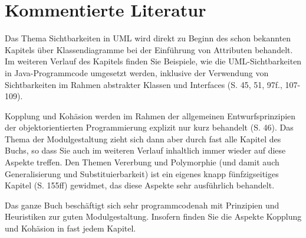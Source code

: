 \section{Kommentierte Literatur}
\label{sec:Kap-9.4}


{Das Thema Sichtbarkeiten in UML wird direkt zu Beginn des schon bekannten \mbox{Kapitels} über Klassendiagramme bei der Einführung von Attributen behandelt. Im weiteren Verlauf des Kapitels finden Sie Beispiele, wie die UML-Sichtbarkeiten in Java-Programmcode umgesetzt werden, inklusive der Verwendung von Sichtbar\-keiten im Rahmen abstrakter Klassen und Interfaces (S. 45, 51, 97f., 107-109).}

{Kopplung und Kohäsion werden im Rahmen der allgemeinen Entwurfsprinzipien der objektorientierten Programmierung explizit nur kurz behandelt (S. 46). Das \mbox{Thema} der Modulgestaltung zieht sich dann aber durch fast alle Kapitel des Buchs, so dass Sie auch im weiteren Verlauf inhaltlich immer wieder auf diese Aspekte treffen. Den Themen Vererbung und Polymorphie (und damit auch Generalisierung und Substituier\-barkeit) ist ein eigenes knapp fünfzigseitiges Kapitel (S. 155ff) gewidmet, das diese Aspekte sehr ausführlich behandelt.} 

{Das ganze Buch beschäftigt sich sehr programmcodenah mit Prinzipien und Heuristiken zur guten Modulgestaltung. Insofern finden Sie die Aspekte Kopplung und Kohäsion in fast jedem Kapitel.}
	

